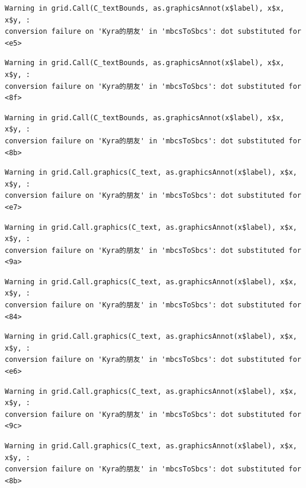 \documentclass[
  letterpaper,
  DIV=11,
  numbers=noendperiod]{scrreprt}
\begin{document}
\begin{verbatim}
Warning in grid.Call(C_textBounds, as.graphicsAnnot(x$label), x$x, x$y, :
conversion failure on 'Kyra的朋友' in 'mbcsToSbcs': dot substituted for <e5>
\end{verbatim}

\begin{verbatim}
Warning in grid.Call(C_textBounds, as.graphicsAnnot(x$label), x$x, x$y, :
conversion failure on 'Kyra的朋友' in 'mbcsToSbcs': dot substituted for <8f>
\end{verbatim}

\begin{verbatim}
Warning in grid.Call(C_textBounds, as.graphicsAnnot(x$label), x$x, x$y, :
conversion failure on 'Kyra的朋友' in 'mbcsToSbcs': dot substituted for <8b>
\end{verbatim}

\begin{verbatim}
Warning in grid.Call.graphics(C_text, as.graphicsAnnot(x$label), x$x, x$y, :
conversion failure on 'Kyra的朋友' in 'mbcsToSbcs': dot substituted for <e7>
\end{verbatim}

\begin{verbatim}
Warning in grid.Call.graphics(C_text, as.graphicsAnnot(x$label), x$x, x$y, :
conversion failure on 'Kyra的朋友' in 'mbcsToSbcs': dot substituted for <9a>
\end{verbatim}

\begin{verbatim}
Warning in grid.Call.graphics(C_text, as.graphicsAnnot(x$label), x$x, x$y, :
conversion failure on 'Kyra的朋友' in 'mbcsToSbcs': dot substituted for <84>
\end{verbatim}

\begin{verbatim}
Warning in grid.Call.graphics(C_text, as.graphicsAnnot(x$label), x$x, x$y, :
conversion failure on 'Kyra的朋友' in 'mbcsToSbcs': dot substituted for <e6>
\end{verbatim}

\begin{verbatim}
Warning in grid.Call.graphics(C_text, as.graphicsAnnot(x$label), x$x, x$y, :
conversion failure on 'Kyra的朋友' in 'mbcsToSbcs': dot substituted for <9c>
\end{verbatim}

\begin{verbatim}
Warning in grid.Call.graphics(C_text, as.graphicsAnnot(x$label), x$x, x$y, :
conversion failure on 'Kyra的朋友' in 'mbcsToSbcs': dot substituted for <8b>
\end{verbatim}
\end{document}
